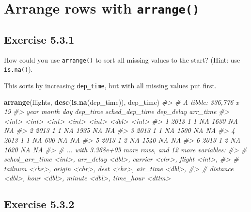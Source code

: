 \documentclass[]{book}
\newenvironment{Shaded}{\begin{snugshade}}{\end{snugshade}}
\newcommand{\CommentTok}[1]{\textcolor[rgb]{0.56,0.35,0.01}{\textit{#1}}}
\newcommand{\KeywordTok}[1]{\textcolor[rgb]{0.13,0.29,0.53}{\textbf{#1}}}
\newcommand{\NormalTok}[1]{#1}
\theoremstyle{plain}
\theoremstyle{remark}
\begin{document}
\hypertarget{arrange-rows-with-arrange}{%
\section{\texorpdfstring{Arrange rows with
\texttt{arrange()}}{Arrange rows with arrange()}}\label{arrange-rows-with-arrange}}

\hypertarget{exercise-5.3.1}{%
\subsection*{\texorpdfstring{Exercise
{5.3.1}}{Exercise 5.3.1}}\label{exercise-5.3.1}}

How could you use \texttt{arrange()} to sort all missing values to the
start? (Hint: use \texttt{is.na()}).

This sorts by increasing \texttt{dep\_time}, but with all missing values
put first.

\begin{Shaded}
\begin{Highlighting}[]
\KeywordTok{arrange}\NormalTok{(flights, }\KeywordTok{desc}\NormalTok{(}\KeywordTok{is.na}\NormalTok{(dep_time)), dep_time)}
\CommentTok{#> # A tibble: 336,776 x 19}
\CommentTok{#>    year month   day dep_time sched_dep_time dep_delay arr_time}
\CommentTok{#>   <int> <int> <int>    <int>          <int>     <dbl>    <int>}
\CommentTok{#> 1  2013     1     1       NA           1630        NA       NA}
\CommentTok{#> 2  2013     1     1       NA           1935        NA       NA}
\CommentTok{#> 3  2013     1     1       NA           1500        NA       NA}
\CommentTok{#> 4  2013     1     1       NA            600        NA       NA}
\CommentTok{#> 5  2013     1     2       NA           1540        NA       NA}
\CommentTok{#> 6  2013     1     2       NA           1620        NA       NA}
\CommentTok{#> # ... with 3.368e+05 more rows, and 12 more variables:}
\CommentTok{#> #   sched_arr_time <int>, arr_delay <dbl>, carrier <chr>, flight <int>,}
\CommentTok{#> #   tailnum <chr>, origin <chr>, dest <chr>, air_time <dbl>,}
\CommentTok{#> #   distance <dbl>, hour <dbl>, minute <dbl>, time_hour <dttm>}
\end{Highlighting}
\end{Shaded}

\hypertarget{exercise-5.3.2}{%
\subsection*{\texorpdfstring{Exercise
{5.3.2}}{Exercise 5.3.2}}\label{exercise-5.3.2}}
\end{document}
